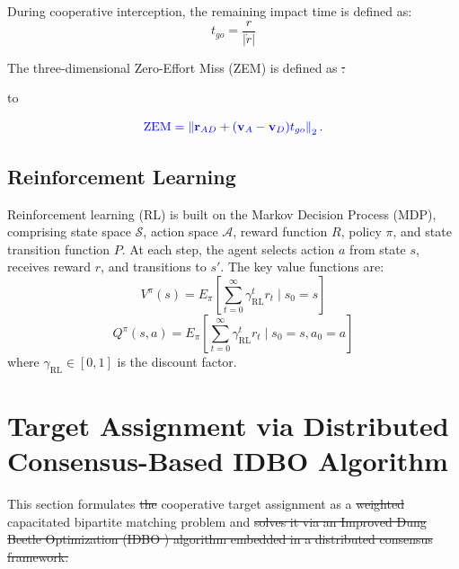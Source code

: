 \documentclass[lettersize,journal]{IEEEtran}
\providecommand{\DIFadd}[1]{{\protect\color{blue}#1}} %
\providecommand{\DIFdel}[1]{{\protect\color{red}\sout{#1}}}                      %
\newcommand{\DIFdelDISPLAY}[1]{%
  \par\addvspace{4pt}%
  \sbox{\DIFDELbox}{$\displaystyle\color{red}\begin{aligned}#1\end{aligned}$}%
  \noindent\hbox to\hsize{\hfil %
    \rlap{\usebox{\DIFDELbox}}%
    \raisebox{\dimexpr(\ht\DIFDELbox-\dp\DIFDELbox)/2\relax}[0pt][0pt]{\textcolor{red}{\rule{\wd\DIFDELbox}{0.6pt}}}%
    \hfil}%
  \par\addvspace{4pt}%
} %
\providecommand{\DIFaddbegin}{} %
\providecommand{\DIFaddend}{} %
\providecommand{\DIFdelbegin}{} %
\providecommand{\DIFdelend}{} %
\newcommand{\DIFscaledelfig}{0.5}
\newlength{\DIFdelgraphicswidth} %
\newlength{\DIFdelgraphicsheight} %
\newcommand{\DIFaddincludegraphics}[2][]{{\color{blue}\fbox{\DIFOincludegraphics[#1]{#2}}}} %
\newcommand{\DIFdelincludegraphics}[2][]{%
\sbox{\DIFdelgraphicsbox}{\DIFOincludegraphics[#1]{#2}}%
\settoboxwidth{\DIFdelgraphicswidth}{\DIFdelgraphicsbox} %
\settoboxtotalheight{\DIFdelgraphicsheight}{\DIFdelgraphicsbox} %
\scalebox{\DIFscaledelfig}{%
\parbox[b]{\DIFdelgraphicswidth}{\usebox{\DIFdelgraphicsbox}\\[-\baselineskip] \rule{\DIFdelgraphicswidth}{0em}}\llap{\resizebox{\DIFdelgraphicswidth}{\DIFdelgraphicsheight}{%
\setlength{\unitlength}{\DIFdelgraphicswidth}%
\begin{picture}(1,1)%
\thicklines\linethickness{2pt} %
{\color[rgb]{1,0,0}\put(0,0){\framebox(1,1){}}}%
{\color[rgb]{1,0,0}\put(0,0){\line( 1,1){1}}}%
{\color[rgb]{1,0,0}\put(0,1){\line(1,-1){1}}}%
\end{picture}%
}\hspace*{3pt}}} %
} %
\DeclareRobustCommand{\DIFaddbegin}{\DIFOaddbegin \let\includegraphics\DIFaddincludegraphics} %
\DeclareRobustCommand{\DIFaddend}{\DIFOaddend \let\includegraphics\DIFOincludegraphics} %
\DeclareRobustCommand{\DIFdelbegin}{\DIFOdelbegin \let\includegraphics\DIFdelincludegraphics} %
\DeclareRobustCommand{\DIFdelend}{\DIFOaddend \let\includegraphics\DIFOincludegraphics} %
\begin{document}
During cooperative interception, the remaining impact time is defined as:
\begin{equation}
\label{shijian}
t_{go}=\frac{r}{\left|\dot{r}\right|}
\end{equation}

The \DIFaddbegin \DIFadd{three-dimensional }\DIFaddend Zero-Effort Miss (ZEM) is defined as
\DIFdelbegin \DIFdel{:
}\DIFdelDISPLAY{%
ZEM = \frac{r^{2}\cdot\dot{q}}{\left|\dot{r}\right|}
}
\DIFdelend \DIFaddbegin \begin{equation}
\DIFadd{\label{ZEM}
\operatorname{ZEM}=\left\|\mathbf r_{AD}
+(\mathbf v_A-\mathbf v_D)t_{go}\right\|_2.
}\end{equation}\DIFaddend 

\subsection{Reinforcement Learning}

Reinforcement learning (RL) is built on the Markov Decision Process (MDP), comprising state
space $\mathcal{S}$, action space $\mathcal{A}$, reward function $R$, policy $\pi$, and state
transition function $P$.
At each step, the agent selects action $a$ from state $s$, receives reward $r$, and
transitions to $s'$.
The key value functions are:
\begin{equation}
\label{RLV}
V^{\pi}(s)=E_{\pi}\left[\sum_{t=0}^{\infty}\gamma_{\mathrm{RL}}^{t}r_{t}\mid s_{0}=s\right]
\end{equation}
\begin{equation}
\label{RLQ}
Q^{\pi}(s,a)=E_{\pi}\left[\sum_{t=0}^{\infty}\gamma_{\mathrm{RL}}^{t}r_{t}\mid s_{0}=s,a_{0}=a\right]
\end{equation}
where $\gamma_{\mathrm{RL}}\in[0,1]$ is the discount factor.






\section{Target Assignment via Distributed Consensus-Based IDBO Algorithm}
\label{sec:target_assignment}

This section formulates \DIFdelbegin \DIFdel{the }\DIFdelend cooperative target assignment as a \DIFdelbegin \DIFdel{weighted }\DIFdelend \DIFaddbegin \DIFadd{capacitated }\DIFaddend bipartite matching
problem and \DIFdelbegin \DIFdel{solves it via an Improved Dung Beetle Optimization (IDBO ) algorithm embedded in a
distributed consensus framework. }%
\end{document}
